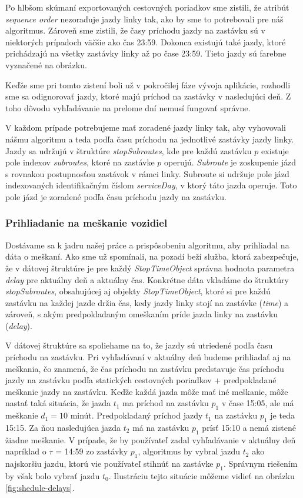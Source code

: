Po hlbšom skúmaní exportovaných cestovných poriadkov sme zistili, že atribút \textit{sequence order} nezoraďuje jazdy linky tak, ako by sme to potrebovali pre náš algoritmus. Zároveň sme zistili, že časy príchodu jazdy na zastávku sú v niektorých prípadoch väčšie ako čas 23:59. Dokonca existujú také jazdy, ktoré prichádzajú na všetky zastávky linky až po čase 23:59. Tieto jazdy sú farebne vyznačené na obrázku.

Keďže sme pri tomto zistení boli už v pokročilej fáze vývoja aplikácie, rozhodli sme sa odignorovať jazdy, ktoré majú príchod na zastávky v nasledujúci deň. Z toho dôvodu vyhľadávanie na prelome dní nemusí fungovať správne.

V každom prípade potrebujeme mať zoradené jazdy linky tak, aby vyhovovali nášmu algoritmu a teda podľa času príchodu na jednotlivé zastávky jazdy linky. Jazdy sa udržujú v štruktúre \textit{stopSubroutes}, kde pre každú zastávku $p$ existuje pole indexov \textit{subroutes}, ktoré na zastávke $p$ operujú. \textit{Subroute} je zoskupenie jázd s rovnakou postupnosťou zastávok v rámci linky. Subroute si udržuje pole jázd indexovaných identifikačným číslom \textit{serviceDay}, v ktorý táto jazda operuje. Toto pole jázd je zoradené podľa času príchodu jazdy na zastávku. 

\subsubsection{Prihliadanie na meškanie vozidiel}
Dostávame sa k jadru našej práce a prispôsobeniu algoritmu, aby prihliadal na dáta o meškaní. Ako sme už spomínali, na pozadí beží služba, ktorá zabezpečuje, že v dátovej štruktúre je pre každý \textit{StopTimeObject} správna hodnota parametra \textit{delay} pre aktuálny deň a aktuálny čas. 
Konkrétne dáta vkladáme do štruktúry \textit{stopSubroutes}, obsahujúcej aj objekty \textit{StopTimeObject}, ktoré si pre každú zastávku na každej jazde držia čas, kedy jazdy linky stojí na zastávke (\textit{time}) a zároveň, s akým predpokladaným omeškaním príde jazda linky na zastávku (\textit{delay}). 

V dátovej štruktúre sa spoliehame na to, že jazdy sú utriedené podľa času príchodu na zastávku. Pri vyhľadávaní v aktuálny deň budeme prihliadať aj na meškania, čo znamená, že čas príchodu na zastávku predstavuje čas príchodu jazdy na zastávku podľa statických cestovných poriadkov + predpokladané meškanie jazdy na zastávku. Keďže každá jazda môže mať iné meškanie, môže nastať taká situácia, že jazda $t_1$ ma príchod na zastávku $p_1$ v čase 15:05, ale má meškanie $d_1=10$ minút. Predpokladaný príchod jazdy $t_1$ na zastávku $p_1$ je teda 15:15. Za ňou nasledujúca jazda $t_2$ má na zastávku $p_1$ prísť 15:10 a nemá zistené žiadne meškanie. V prípade, že by používateľ zadal vyhľadávanie v aktuálny deň napríklad o $\tau$ = 14:59 zo zastávky $p_1$, algoritmus by vybral jazdu $t_2$ ako najskoršiu jazdu, ktorú vie používateľ stihnúť na zastávke $p_1$. Správnym riešením by však bolo vybrať jazdu $t_0$. Ilustráciu tejto situácie môžeme vidieť na obrázku \ref{fig:shedule-delays}. 

